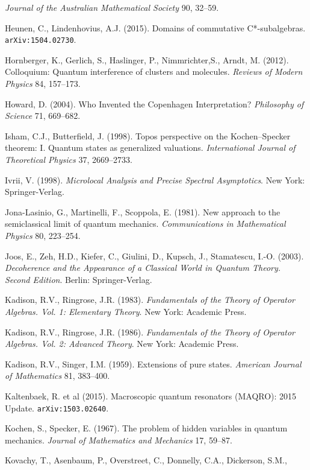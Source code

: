 \documentclass[12pt]{article}
\begin{document}
\begin{footnotesize}
\begin{trivlist}
  \emph{Journal of the Australian Mathematical Society} 90, 32--59.
    \item  Heunen, C., Lindenhovius, A.J. (2015). Domains of commutative C*-subalgebras.
   \texttt{arXiv:1504.02730}.   
\item Hornberger, K., Gerlich, S.,  Haslinger, P.,  Nimmrichter,S.,  Arndt, M. (2012).
Colloquium: Quantum interference of clusters and molecules. \emph{Reviews of Modern Physics} 84, 157--173.
\item Howard, D. (2004). Who Invented the Copenhagen Interpretation? 
\emph{Philosophy of Science} 71, 669--682.
\item Isham, C.J.,  Butterfield, J. (1998). Topos perspective on the Kochen--Specker theorem: I. Quantum states as generalized valuations. \emph{International Journal of Theoretical Physics} 37, 2669--2733. 
\item Ivrii, V. (1998). \emph{Microlocal Analysis and Precise Spectral Asymptotics}. New York: Springer-Verlag.
\item
Jona-Lasinio, G., Martinelli, F., Scoppola, E. (1981).
 New approach to the semiclassical limit of quantum mechanics.
\emph{Communications in Mathematical Physics} 80, 223--254.
\item Joos, E., Zeh, H.D., Kiefer, C., Giulini, D., Kupsch, J.,  Stamatescu, I.-O. (2003).
\emph{Decoherence and the Appearance of a Classical World in Quantum Theory. Second Edition}. Berlin: Springer-Verlag.
\item Kadison, R.V.,  Ringrose, J.R. (1983). \emph{Fundamentals of the Theory of Operator Algebras. Vol. 1: Elementary Theory}.   New York: Academic Press.
 \item Kadison, R.V., Ringrose, J.R. (1986). \emph{Fundamentals of the Theory of Operator Algebras. Vol. 2: Advanced  Theory}.   New York: Academic Press. 
\item Kadison, R.V.,  Singer, I.M. (1959). Extensions of pure states. \emph{American Journal of Mathematics} 81, 383--400. 
\item Kaltenbaek, R. et al (2015). Macroscopic quantum resonators (MAQRO): 2015 Update.  \texttt{arXiv:1503.02640}. 
 \item Kochen, S.,  Specker, E. (1967).
The problem of hidden variables in quantum mechanics.  \emph{Journal of Mathematics and Mechanics} 17, 59--87.
\item Kovachy, T.,  Asenbaum,	P., Overstreet,  C., Donnelly,  C.A.,  Dickerson,	S.M., 

\end{trivlist}
\end{footnotesize}
\end{document}
